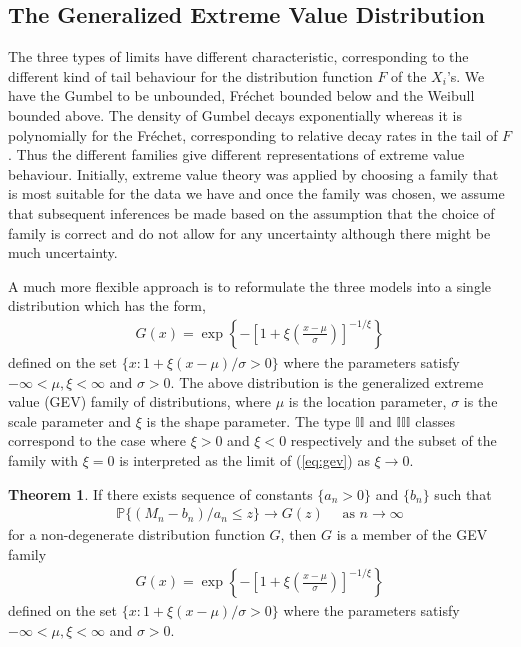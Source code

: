 \documentclass[a4paper,10pt]{article}
\theoremstyle{definition}
\newtheorem{thm}{Theorem}[section]
\numberwithin{equation}{section}
\begin{document}
\subsection{The Generalized Extreme Value Distribution}
The three types of limits have different characteristic, corresponding to the different kind of tail behaviour for the distribution function $F$ of the $X_i$'s. We have the Gumbel to be unbounded, Fr\'echet bounded below and the Weibull bounded above. The density of Gumbel decays exponentially whereas it is polynomially for the Fr\'echet, corresponding to relative decay rates in the tail of $F$. Thus the different families give different representations of extreme value behaviour. Initially, extreme value theory was applied by choosing a family that is most suitable for the data we have and once the family was chosen, we assume that subsequent inferences be made based on the assumption that the choice of family is correct and do not allow for any uncertainty although there might be much uncertainty.

A much more flexible approach is to reformulate the three models into a single distribution which has the form,
\begin{align}\label{eq:gev}
G(x) = \exp \left\{-\left[1+\xi\left(\frac{x-\mu}{\sigma}\right)\right]^{-1/\xi}\right\}
\end{align}
defined on the set $\{x : 1 + \xi(x-\mu)/\sigma>0\}$ where the parameters satisfy $-\infty<\mu, \xi<\infty$ and $\sigma >0$. The above distribution is the generalized extreme value (GEV) family of distributions, where $\mu$ is the location parameter, $\sigma$ is the scale parameter and $\xi$ is the shape parameter. The type $\mathbb{II}$ and $\mathbb{III}$ classes correspond to the case where $\xi >0$ and $\xi<0$ respectively and the subset of the family with $\xi = 0$ is interpreted as the limit of (\ref{eq:gev}) as $\xi \to 0$.

\begin{thm}\label{thm:gev}
If there exists sequence of constants $\{a_n>0\}$ and $\{b_n\}$ such that 
\begin{align}\label{eq:gevlimit}
\mathbb{P}\{(M_n - b_n)/a_n\leq z\} \to G(z) \quad\text{ as } n \to \infty
\end{align}
for a non-degenerate distribution function $G$, then $G$ is a member of the GEV family
\begin{align}
G(x) = \exp \left\{-\left[1+\xi\left(\frac{x-\mu}{\sigma}\right)\right]^{-1/\xi}\right\}
\end{align}
defined on the set $\{x : 1 + \xi(x-\mu)/\sigma>0\}$ where the parameters satisfy $-\infty<\mu, \xi<\infty$ and $\sigma >0$.
\end{thm}
\end{document}

